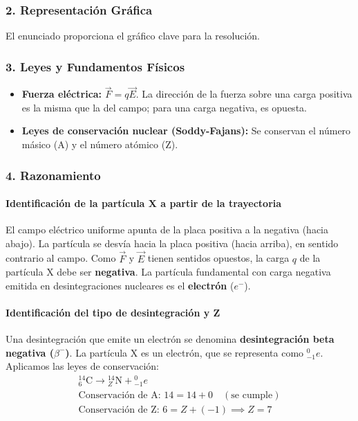 \subsubsection*{2. Representación Gráfica}
El enunciado proporciona el gráfico clave para la resolución.
\subsubsection*{3. Leyes y Fundamentos Físicos}
\begin{itemize}
    \item \textbf{Fuerza eléctrica:} $\vec{F}=q\vec{E}$. La dirección de la fuerza sobre una carga positiva es la misma que la del campo; para una carga negativa, es opuesta.
    \item \textbf{Leyes de conservación nuclear (Soddy-Fajans):} Se conservan el número másico (A) y el número atómico (Z).
\end{itemize}
\subsubsection*{4. Razonamiento}
\paragraph{Identificación de la partícula X a partir de la trayectoria}
El campo eléctrico uniforme apunta de la placa positiva a la negativa (hacia abajo). La partícula se desvía hacia la placa positiva (hacia arriba), en sentido contrario al campo. Como $\vec{F}$ y $\vec{E}$ tienen sentidos opuestos, la carga $q$ de la partícula X debe ser \textbf{negativa}. La partícula fundamental con carga negativa emitida en desintegraciones nucleares es el \textbf{electrón} ($e^-$).
\paragraph{Identificación del tipo de desintegración y Z}
Una desintegración que emite un electrón se denomina \textbf{desintegración beta negativa ($\beta^-$)}. La partícula X es un electrón, que se representa como ${}_{-1}^{0}e$.
Aplicamos las leyes de conservación:
\begin{gather}
    {}_{6}^{14}\text{C}\rightarrow{}_{Z}^{14}\text{N}+{}_{-1}^{0}e \\
    \text{Conservación de A: } 14 = 14 + 0 \quad (\text{se cumple}) \\
    \text{Conservación de Z: } 6 = Z + (-1) \implies Z = 7
\end{gather}
